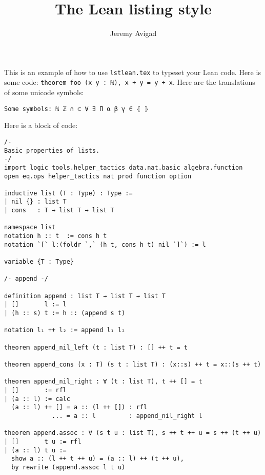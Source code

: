 \documentclass{article}
\title{The Lean listing style}
\author{Jeremy Avigad}
\begin{document}
\maketitle 

This is an example of how to use \verb=lstlean.tex= to typeset your Lean code. Here is some code: \lstinline{theorem foo (x y : ℕ), x + y = y + x}.  Here are the translations of some unicode symbols:
\begin{lstlisting}
Some symbols: ℕ ℤ ∩ ⊂ ∀ ∃ Π α β γ ∈ ⦃ ⦄
\end{lstlisting}
Here is a block of code:
\begin{lstlisting}
/-
Basic properties of lists.
-/
import logic tools.helper_tactics data.nat.basic algebra.function
open eq.ops helper_tactics nat prod function option

inductive list (T : Type) : Type :=
| nil {} : list T
| cons   : T → list T → list T

namespace list
notation h :: t  := cons h t
notation `[` l:(foldr `,` (h t, cons h t) nil `]`) := l

variable {T : Type}

/- append -/

definition append : list T → list T → list T
| []       l := l
| (h :: s) t := h :: (append s t)

notation l₁ ++ l₂ := append l₁ l₂

theorem append_nil_left (t : list T) : [] ++ t = t

theorem append_cons (x : T) (s t : list T) : (x::s) ++ t = x::(s ++ t)

theorem append_nil_right : ∀ (t : list T), t ++ [] = t
| []       := rfl
| (a :: l) := calc
  (a :: l) ++ [] = a :: (l ++ []) : rfl
             ... = a :: l         : append_nil_right l

theorem append.assoc : ∀ (s t u : list T), s ++ t ++ u = s ++ (t ++ u)
| []       t u := rfl
| (a :: l) t u :=
  show a :: (l ++ t ++ u) = (a :: l) ++ (t ++ u),
  by rewrite (append.assoc l t u)
\end{lstlisting}
\end{document}
